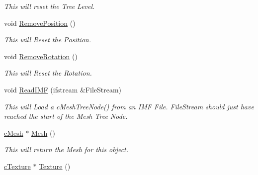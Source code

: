 \begin{DoxyCompactItemize}
\begin{DoxyCompactList}\small\item\em This will reset the Tree Level. \end{DoxyCompactList}\item 
\hypertarget{classc_mesh_tree_node_ad9659fb0be5e1300bcda2265d651dd97}{
void \hyperlink{classc_mesh_tree_node_ad9659fb0be5e1300bcda2265d651dd97}{RemovePosition} ()}
\label{classc_mesh_tree_node_ad9659fb0be5e1300bcda2265d651dd97}

\begin{DoxyCompactList}\small\item\em This will Reset the Position. \end{DoxyCompactList}\item 
\hypertarget{classc_mesh_tree_node_a9ea8fa642a22c047b2e6d559976b615b}{
void \hyperlink{classc_mesh_tree_node_a9ea8fa642a22c047b2e6d559976b615b}{RemoveRotation} ()}
\label{classc_mesh_tree_node_a9ea8fa642a22c047b2e6d559976b615b}

\begin{DoxyCompactList}\small\item\em This will Reset the Rotation. \end{DoxyCompactList}\item 
\hypertarget{classc_mesh_tree_node_a1ca09fa05700321ca076d327fa99220b}{
void \hyperlink{classc_mesh_tree_node_a1ca09fa05700321ca076d327fa99220b}{ReadIMF} (ifstream \&FileStream)}
\label{classc_mesh_tree_node_a1ca09fa05700321ca076d327fa99220b}

\begin{DoxyCompactList}\small\item\em This will Load a cMeshTreeNode() from an IMF File. FileStream should just have reached the start of the Mesh Tree Node. \end{DoxyCompactList}\item 
\hypertarget{classc_mesh_tree_node_ae6da4f910c12301dc657dea2f093c27f}{
\hyperlink{classc_mesh}{cMesh} $\ast$ \hyperlink{classc_mesh_tree_node_ae6da4f910c12301dc657dea2f093c27f}{Mesh} ()}
\label{classc_mesh_tree_node_ae6da4f910c12301dc657dea2f093c27f}

\begin{DoxyCompactList}\small\item\em This will return the Mesh for this object. \end{DoxyCompactList}\item 
\hypertarget{classc_mesh_tree_node_ae680c7ded6800ef8b1b6f473b8ed89e0}{
\hyperlink{classc_texture}{cTexture} $\ast$ \hyperlink{classc_mesh_tree_node_ae680c7ded6800ef8b1b6f473b8ed89e0}{Texture} ()}
\label{classc_mesh_tree_node_ae680c7ded6800ef8b1b6f473b8ed89e0}


\end{DoxyCompactItemize}
